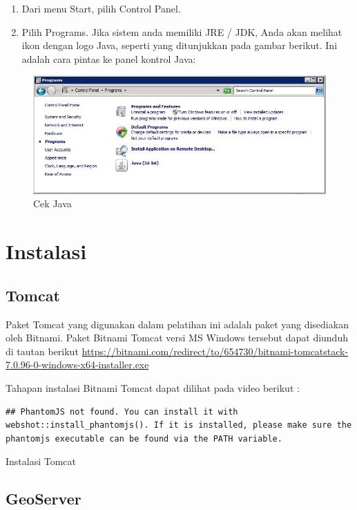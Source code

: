 \documentclass[]{book}
\begin{document}
\begin{enumerate}
\def\labelenumi{\arabic{enumi}.}
\item
  Dari menu Start, pilih Control Panel.
\item
  Pilih Programs. Jika sistem anda memiliki JRE / JDK, Anda akan melihat ikon dengan
  logo Java, seperti yang ditunjukkan pada gambar berikut. Ini adalah cara pintas ke panel kontrol Java:
\end{enumerate}

\begin{figure}

{\centering \includegraphics[width=0.6\linewidth]{images/07/fig71} 

}

\caption{Cek Java}\label{fig:fig71}
\end{figure}

\hypertarget{instalasi}{%
\section{Instalasi}\label{instalasi}}

\hypertarget{tomcat}{%
\subsection{Tomcat}\label{tomcat}}

Paket Tomcat yang digunakan dalam pelatihan ini adalah paket yang disediakan oleh Bitnami. Paket Bitnami Tomcat versi MS Windows tersebut dapat diunduh di tautan berikut \url{https://bitnami.com/redirect/to/654730/bitnami-tomcatstack-7.0.96-0-windows-x64-installer.exe}

Tahapan instalasi Bitnami Tomcat dapat dilihat pada video berikut :

\begin{verbatim}
## PhantomJS not found. You can install it with webshot::install_phantomjs(). If it is installed, please make sure the phantomjs executable can be found via the PATH variable.
\end{verbatim}

\label{fig:embed1}Instalasi Tomcat

\hypertarget{geoserver-1}{%
\subsection{GeoServer}\label{geoserver-1}}
\end{document}
